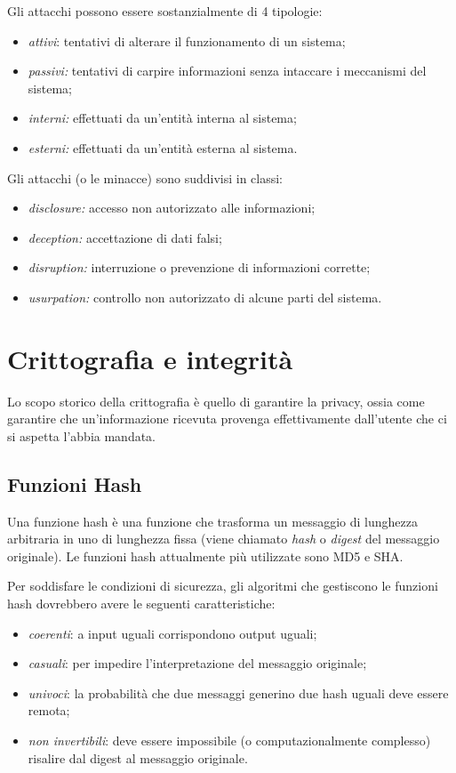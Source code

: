 \documentclass[a4paper, 11pt]{article}
\begin{document}
\begin{multicols}{2}
		Gli attacchi possono essere sostanzialmente di 4 tipologie:
		\begin{itemize}
			\item \textit{attivi}: tentativi di alterare il funzionamento di un sistema;
			\item \textit{passivi:} tentativi di carpire informazioni senza intaccare i meccanismi del sistema;
			\item \textit{interni:} effettuati da un'entità interna al sistema;
			\item \textit{esterni:} effettuati da un'entità esterna al sistema.
		\end{itemize}
		
		Gli attacchi (o le minacce) sono suddivisi in classi:
		\begin{itemize}
			\item \textit{disclosure:} accesso non autorizzato alle informazioni;
			\item \textit{deception:} accettazione di dati falsi;
			\item \textit{disruption:} interruzione o prevenzione di informazioni corrette;
			\item \textit{usurpation:} controllo non autorizzato di alcune parti del sistema.
		\end{itemize}
		
		\section{Crittografia e integrità}
		Lo scopo storico della crittografia è quello di garantire la privacy, ossia come garantire che un'informazione ricevuta provenga effettivamente dall'utente che ci si aspetta l'abbia mandata.
		
		\subsection{Funzioni Hash}
		Una funzione hash è una funzione che trasforma un messaggio di lunghezza arbitraria in uno di lunghezza fissa (viene chiamato \textit{hash} o \textit{digest} del messaggio originale). Le funzioni hash attualmente più utilizzate sono MD5 e SHA.
		
		Per soddisfare le condizioni di sicurezza, gli algoritmi che gestiscono le funzioni hash dovrebbero avere le seguenti caratteristiche:
		\begin{itemize}
			\item \textit{coerenti}: a input uguali corrispondono output uguali;
			\item \textit{casuali}: per impedire l'interpretazione del messaggio originale;
			\item \textit{univoci}: la probabilità che due messaggi generino due hash uguali deve essere remota;
			\item \textit{non invertibili}: deve essere impossibile (o computazionalmente complesso) risalire dal digest al messaggio originale.
		\end{itemize}
	

\end{multicols}
\end{document}
